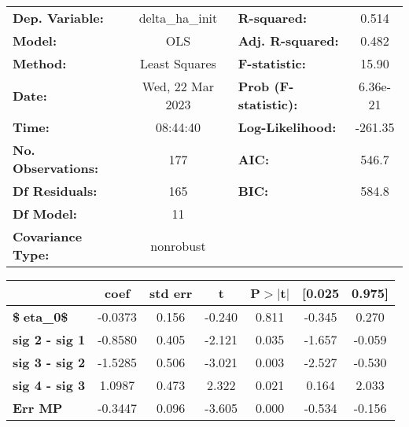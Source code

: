 \begin{center}
\begin{tabular}{lclc}
\toprule
\textbf{Dep. Variable:}    & delta\_ha\_init  & \textbf{  R-squared:         } &    0.514  \\
\textbf{Model:}            &       OLS        & \textbf{  Adj. R-squared:    } &    0.482  \\
\textbf{Method:}           &  Least Squares   & \textbf{  F-statistic:       } &    15.90  \\
\textbf{Date:}             & Wed, 22 Mar 2023 & \textbf{  Prob (F-statistic):} & 6.36e-21  \\
\textbf{Time:}             &     08:44:40     & \textbf{  Log-Likelihood:    } &  -261.35  \\
\textbf{No. Observations:} &         177      & \textbf{  AIC:               } &    546.7  \\
\textbf{Df Residuals:}     &         165      & \textbf{  BIC:               } &    584.8  \\
\textbf{Df Model:}         &          11      & \textbf{                     } &           \\
\textbf{Covariance Type:}  &    nonrobust     & \textbf{                     } &           \\
\bottomrule
\end{tabular}
\end{center}\begin{center}
\begin{tabular}{lcccccc}
\toprule
                                & \textbf{coef} & \textbf{std err} & \textbf{t} & \textbf{P$> |$t$|$} & \textbf{[0.025} & \textbf{0.975]}  \\
\midrule
\textbf{\$eta\_{0}\$}          &      -0.0373  &        0.156     &    -0.240  &         0.811        &       -0.345    &        0.270     \\
\textbf{sig 2 - sig 1}          &      -0.8580  &        0.405     &    -2.121  &         0.035        &       -1.657    &       -0.059     \\
\textbf{sig 3 - sig 2}          &      -1.5285  &        0.506     &    -3.021  &         0.003        &       -2.527    &       -0.530     \\
\textbf{sig 4 - sig 3}          &       1.0987  &        0.473     &     2.322  &         0.021        &        0.164    &        2.033     \\
\textbf{Err MP}                 &      -0.3447  &        0.096     &    -3.605  &         0.000        &       -0.534    &       -0.156     \\

\end{tabular}
\end{center}
